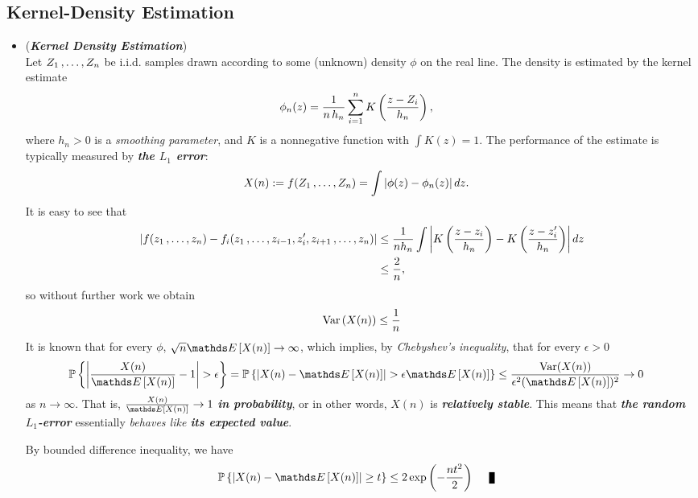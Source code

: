 \documentclass[11pt]{article}
\begin{document}
\subsection{Kernel-Density Estimation}
\begin{itemize}
\item \begin{example} (\emph{\textbf{Kernel Density Estimation}})\\
Let $Z_1 \,{,}\ldots{,}\, Z_n$ be i.i.d. samples drawn according to some (unknown) density $\phi$ on the real line. The density is estimated by the kernel estimate
\begin{align*}
\phi_n(z) &=\frac{1}{n\, h_n} \sum_{i=1}^{n}K\left(\frac{z - Z_i}{h_n}\right),
\end{align*} where $h_n > 0$ is a \emph{smoothing parameter}, and $K$ is a nonnegative function with $\int K(z) = 1$. The performance of the estimate is typically measured by \emph{\textbf{the $L_1$ error}}:
\begin{align*}
X(n) &:= f(Z_1 \,{,}\ldots{,}\, Z_n) = \int \left\lvert \phi(z) - \phi_n(z) \right\rvert d z.
\end{align*} It is easy to see that
\begin{align*}
\left\lvert f(z_1 \,{,}\ldots{,}\, z_n) - f_i(z_1 \,{,}\ldots{,}\, z_{i-1}, z_i', z_{i+1} \,{,}\ldots{,}\, z_n) \right\rvert &\le \frac{1}{n h_n}\int \left\lvert K\left(\frac{z - z_i}{h_n}\right) - K\left(\frac{z - z_i'}{h_n}\right) \right\rvert d z\\
&\le \frac{2}{n},
\end{align*} so without further work we obtain
\begin{align*}
\text{Var}\left(X(n)\right) \le \frac{1}{n}
\end{align*}
It is known that for every $\phi$, $\sqrt{n} \E{}{X(n)} \to \infty$, which implies, by \emph{Chebyshev's inequality}, that for every $\epsilon > 0$
\begin{align*}
\bP\set{\abs{\frac{X(n)}{\E{}{X(n)}} - 1} > \epsilon} = \bP\set{\abs{X(n) -\E{}{X(n)}} > \epsilon \E{}{X(n)} } &\le \frac{\text{Var}(X(n))}{\epsilon^2 (\E{}{X(n)})^2}  \to 0
\end{align*} as $n \to \infty$. That is, $\frac{X(n)}{\E{}{X(n)}} \to 1$ \emph{\textbf{in probability}}, or in other words, $X(n)$ is \emph{\textbf{relatively stable}}. This means that \emph{\textbf{the random $L_1$-error}} essentially \emph{behaves like \textbf{its expected value}}.

By bounded difference inequality, we have
\begin{align*}
\bP\set{\abs{X(n) - \E{}{X(n)}} \ge t} &\le 2 \exp\paren{- \frac{n t^2}{2}}  \qed
\end{align*}
\end{example}
\end{itemize}
\end{document}

